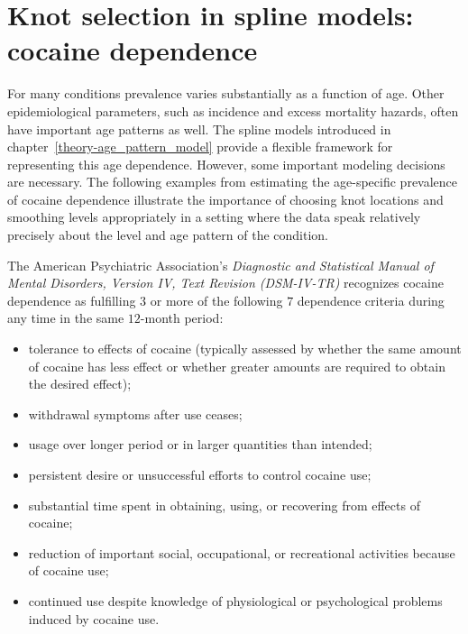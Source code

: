\chapter{Knot selection in spline models: cocaine dependence}
\label{applications-splines_knot_loc}

For many conditions prevalence varies substantially as a function of
age.  Other epidemiological parameters, such as incidence and
excess mortality hazards, often have important age patterns as well.
The spline models introduced in chapter~\ref{theory-age_pattern_model}
provide a flexible framework for representing this age dependence.
However, some important modeling decisions are
necessary.  The following examples from estimating the
age-specific prevalence of cocaine dependence illustrate the
importance of choosing knot locations and smoothing levels
appropriately in a setting where the data speak relatively precisely
about the level and age pattern of the condition.

The American Psychiatric Association's \emph{Diagnostic and Statistical
Manual of Mental Disorders, Version IV,
Text Revision (DSM-IV-TR)} recognizes cocaine dependence as fulfilling $3$ or more of the
following $7$ dependence criteria during any time in the
same $12$-month period: \cite{american_psychiatric_association_diagnostic_2000, wagner_first_2002}
    \begin{itemize} \label{page:app-substance_dependence}
        \item tolerance to effects of cocaine (typically assessed
            by whether the same amount of cocaine has less effect or
            whether greater amounts are required to obtain the desired effect);
        \item withdrawal symptoms after use ceases;
        \item usage over longer period or in larger quantities than intended;
        \item persistent desire or unsuccessful efforts to control
          cocaine use;
        \item substantial time spent in obtaining, using, or recovering
          from effects of cocaine;
        \item reduction of important social, occupational, or recreational
          activities because of cocaine use;
        \item continued use despite knowledge of
          physiological or psychological problems induced by cocaine
          use.
    \end{itemize}

